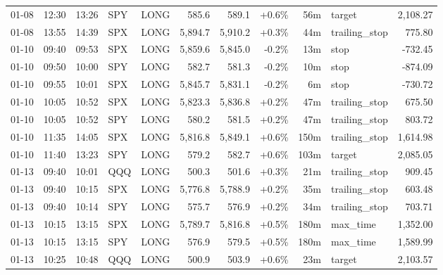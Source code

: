 \documentclass[11pt,a4paper,twoside]{article}
\begin{document}
\begin{center}
\begin{longtable}{>{\color{txtmain}}l l l l l r r r r >{\color{txtmain}}l r}
01-08 & 12:30 & 13:26 & SPY & LONG & 585.6 & 589.1 & \textcolor{wingreen}{+0.6\%} & 56m & target & \textcolor{wingreen}{2,108.27} \\
01-08 & 13:55 & 14:39 & SPX & LONG & 5,894.7 & 5,910.2 & \textcolor{wingreen}{+0.3\%} & 44m & trailing\_stop & \textcolor{wingreen}{775.80} \\
01-10 & 09:40 & 09:53 & SPX & LONG & 5,859.6 & 5,845.0 & \textcolor{lossred}{-0.2\%} & 13m & stop & \textcolor{lossred}{-732.45} \\
01-10 & 09:50 & 10:00 & SPY & LONG & 582.7 & 581.3 & \textcolor{lossred}{-0.2\%} & 10m & stop & \textcolor{lossred}{-874.09} \\
01-10 & 09:55 & 10:01 & SPX & LONG & 5,845.7 & 5,831.1 & \textcolor{lossred}{-0.2\%} & 6m & stop & \textcolor{lossred}{-730.72} \\
01-10 & 10:05 & 10:52 & SPX & LONG & 5,823.3 & 5,836.8 & \textcolor{wingreen}{+0.2\%} & 47m & trailing\_stop & \textcolor{wingreen}{675.50} \\
01-10 & 10:05 & 10:52 & SPY & LONG & 580.2 & 581.5 & \textcolor{wingreen}{+0.2\%} & 47m & trailing\_stop & \textcolor{wingreen}{803.72} \\
01-10 & 11:35 & 14:05 & SPX & LONG & 5,816.8 & 5,849.1 & \textcolor{wingreen}{+0.6\%} & 150m & trailing\_stop & \textcolor{wingreen}{1,614.98} \\
01-10 & 11:40 & 13:23 & SPY & LONG & 579.2 & 582.7 & \textcolor{wingreen}{+0.6\%} & 103m & target & \textcolor{wingreen}{2,085.05} \\
01-13 & 09:40 & 10:01 & QQQ & LONG & 500.3 & 501.6 & \textcolor{wingreen}{+0.3\%} & 21m & trailing\_stop & \textcolor{wingreen}{909.45} \\
01-13 & 09:40 & 10:15 & SPX & LONG & 5,776.8 & 5,788.9 & \textcolor{wingreen}{+0.2\%} & 35m & trailing\_stop & \textcolor{wingreen}{603.48} \\
01-13 & 09:40 & 10:14 & SPY & LONG & 575.7 & 576.9 & \textcolor{wingreen}{+0.2\%} & 34m & trailing\_stop & \textcolor{wingreen}{703.71} \\
01-13 & 10:15 & 13:15 & SPX & LONG & 5,789.7 & 5,816.8 & \textcolor{wingreen}{+0.5\%} & 180m & max\_time & \textcolor{wingreen}{1,352.00} \\
01-13 & 10:15 & 13:15 & SPY & LONG & 576.9 & 579.5 & \textcolor{wingreen}{+0.5\%} & 180m & max\_time & \textcolor{wingreen}{1,589.99} \\
01-13 & 10:25 & 10:48 & QQQ & LONG & 500.9 & 503.9 & \textcolor{wingreen}{+0.6\%} & 23m & target & \textcolor{wingreen}{2,103.57} \\

\end{longtable}
\end{center}
\end{document}
